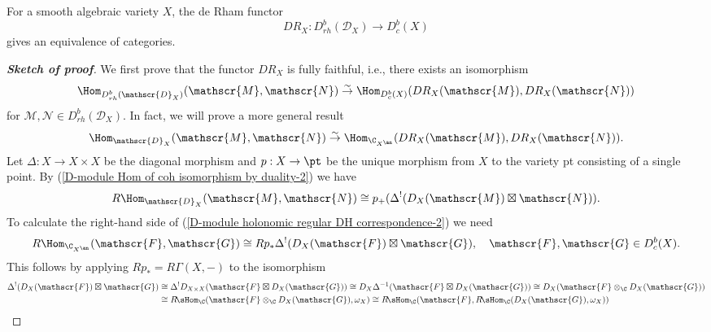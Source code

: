 \begin{theorem}\label{D-module holonomic regular DH correspondence}
For a smooth algebraic variety $X$, the de Rham functor
\[DR_X:D^b_{rh}(\mathscr{D}_X)\to D^b_c(X)\]
gives an equivalence of categories.
\end{theorem}
\begin{proof}[\textbf{Sketch of proof}]
We first prove that the functor $DR_X$ is fully faithful, i.e., there exists
an isomorphism
\begin{equation}\label{D-module holonomic regular DH correspondence-1}
\Hom_{D^b_{rh}(\mathscr{D}_X)}(\mathscr{M},\mathscr{N})\stackrel{\sim}{\to} \Hom_{D^b_c(X)}(DR_X(\mathscr{M}),DR_X(\mathscr{N}))
\end{equation}
for $\mathscr{M},\mathscr{N}\in D^b_{rh}(\mathscr{D}_X)$. In fact, we will prove a more general result
\begin{equation}\label{D-module holonomic regular DH correspondence-2}
\Hom_{\mathscr{D}_X}(\mathscr{M},\mathscr{N})\stackrel{\sim}{\to} \Hom_{\C_{X^{\an}}}(DR_X(\mathscr{M}),DR_X(\mathscr{N})).
\end{equation}
Let $\Delta:X\to X\times X$ be the diagonal morphism and $p:X\to\pt$ be the unique morphism from $X$ to the variety pt consisting of a single point. By (\ref{D-module Hom of coh isomorphism by duality-2}) we have
\begin{equation}\label{D-module holonomic regular DH correspondence-3}
R\Hom_{\mathscr{D}_X}(\mathscr{M},\mathscr{N})\cong p_+(\Delta^!(D_X(\mathscr{M})\boxtimes\mathscr{N})).
\end{equation}
To calculate the right-hand side of (\ref{D-module holonomic regular DH correspondence-2}) we need
\begin{equation}\label{D-module holonomic regular DH correspondence-4}
R\Hom_{\C_{X^\an}}(\mathscr{F},\mathscr{G})\cong Rp_*\Delta^!(D_X(\mathscr{F})\boxtimes\mathscr{G}),\quad \mathscr{F},\mathscr{G}\in D^b_c(X).
\end{equation}
This follows by applying $Rp_*=R\Gamma(X,-)$ to the isomorphism
\begin{align*}
\Delta^!(D_X(\mathscr{F})\boxtimes\mathscr{G})&\cong\Delta^!D_{X\times X}(\mathscr{F}\boxtimes D_X(\mathscr{G}))\cong D_X\Delta^{-1}(\mathscr{F}\boxtimes D_X(\mathscr{G}))\cong D_X(\mathscr{F}\otimes_{\C}D_X(\mathscr{G}))\\
&\cong R\!\sHom_{\C}(\mathscr{F}\otimes_{\C}D_X(\mathscr{G}),\omega_X)\cong R\!\sHom_{\C}(\mathscr{F},R\!\sHom_{\C}(D_X(\mathscr{G}),\omega_X))\\

\end{align*}
\end{proof}
